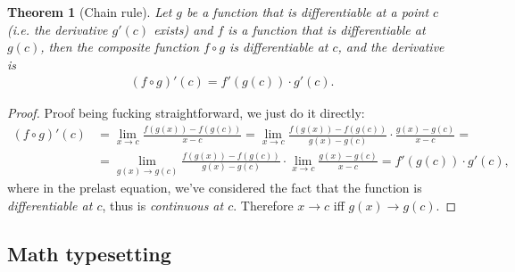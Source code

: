 \documentclass[11pt,a4paper]{report}
\newtheorem{theorem}{Theorem}[section]
\theoremstyle{remark}
\theoremstyle{definition}
\begin{document}
			\begin{theorem}[Chain rule]
				Let $g$ be a function that is differentiable at a point $c$ (i.e. the derivative $g'(c)$ exists) and $f$ is a function that is differentiable at $g(c)$, then the composite function $f \circ g$ is differentiable at $c$, and the derivative is
				\begin{align}
					(f \circ g)'(c) = f'(g(c)) \cdot g'(c).
				\end{align}
			\end{theorem}
			
			\begin{proof}[Proof]
				Proof being fucking straightforward, we just do it directly:
				\begin{align*}
					(f \circ g)'(c) &= \lim\limits_{x \to c} \frac{f(g(x)) - f(g(c))}{x-c} = \lim\limits_{x \to c} \frac{f(g(x)) - f(g(c))}{g(x) - g(c)} \cdot \frac{g(x) - g(c)}{x-c} =
				\\
					&= \lim\limits_{g(x) \to g(c)} \frac{f(g(x)) - f(g(c))}{g(x) - g(c)} \cdot \lim\limits_{x \to c} \frac{g(x) - g(c)}{x-c} = f'(g(c)) \cdot g'(c),
				\end{align*}
				where in the prelast equation, we've considered the fact that the function is \textit{differentiable at $c$}, thus is \textit{continuous at $c$}. Therefore $x \to c$ iff $g(x) \to g(c)$.
			\end{proof}
					
		\subsection*{Math typesetting}
		
\end{document}
